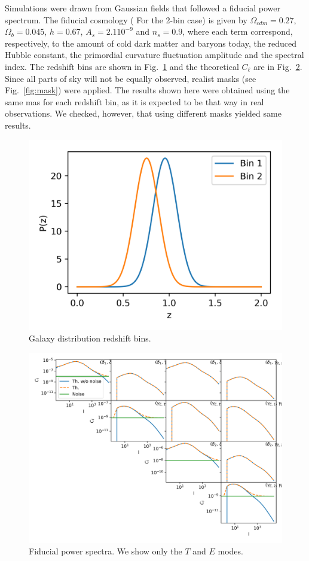 \documentclass[a4paper,11pt]{article}
\newcommand{\cl}{C_\ell}
\newcommand{\red}[1]{{\color{red} #1}}
\begin{document}
Simulations were drawn from Gaussian fields that followed a fiducial power
spectrum. The fiducial cosmology (\red{For the 2-bin case}) is given by
$\Omega_{cdm} = 0.27$, $\Omega_b = 0.045$, $h = 0.67$, $A_s = 2.1 10^{-9}$ and
$n_s = 0.9$, where each term correspond, respectively, to the amount of cold
dark matter and baryons today, the reduced Hubble constant, the primordial
curvature fluctuation amplitude and the spectral index. The redshift bins are
shown in Fig.~\ref{fig:pz} and the theoretical $\cl$ are in
Fig.~\ref{fig:cl-2bins}. Since all parts of sky will not be equally observed,
realist masks (see Fig.~\ref{fig:mask}) were applied.  The results shown here
were obtained using the same mas for each redshift bin, as it is expected to
be that way in real observations. We checked, however, that using different
masks yielded same results. 

\begin{figure}
  \centering
  \includegraphics[width=\columnwidth]{./figures/pz.png}
  \caption{Galaxy distribution redshift bins.}
  \label{fig:pz}
\end{figure}

\begin{figure}
  \centering
  \includegraphics[width=\textwidth]{./figures/cls-sph-2b.png}
  \caption{Fiducial power spectra. We show only the $T$ and $E$ modes.}
  \label{fig:cl-2bins}
\end{figure}
\end{document}
